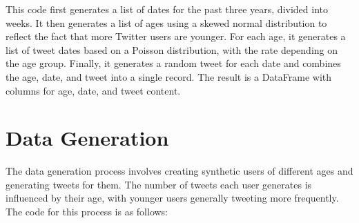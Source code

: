 \documentclass{article}
\begin{document}
This code first generates a list of dates for the past three years, divided into weeks. It then generates a list of ages using a skewed normal distribution to reflect the fact that more Twitter users are younger. For each age, it generates a list of tweet dates based on a Poisson distribution, with the rate depending on the age group. Finally, it generates a random tweet for each date and combines the age, date, and tweet into a single record. The result is a DataFrame with columns for age, date, and tweet content.


\section{Data Generation}

The data generation process involves creating synthetic users of different ages and generating tweets for them. The number of tweets each user generates is influenced by their age, with younger users generally tweeting more frequently. The code for this process is as follows:
\end{document}
